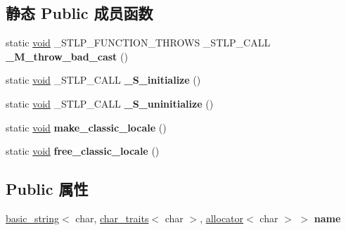 \subsection*{静态 Public 成员函数}
\begin{DoxyCompactItemize}
\item 
\mbox{\label{class___locale__impl_a120488ac7f5af2956e756d90b7b0405c}} 
static \hyperlink{interfacevoid}{void} \+\_\+\+S\+T\+L\+P\+\_\+\+F\+U\+N\+C\+T\+I\+O\+N\+\_\+\+T\+H\+R\+O\+WS \+\_\+\+S\+T\+L\+P\+\_\+\+C\+A\+LL {\bfseries \+\_\+\+M\+\_\+throw\+\_\+bad\+\_\+cast} ()
\item 
\mbox{\label{class___locale__impl_a953a01ba45da0494d104bad491c269bb}} 
static \hyperlink{interfacevoid}{void} \+\_\+\+S\+T\+L\+P\+\_\+\+C\+A\+LL {\bfseries \+\_\+\+S\+\_\+initialize} ()
\item 
\mbox{\label{class___locale__impl_a6539766c0877d31c048d2cbdd97c439e}} 
static \hyperlink{interfacevoid}{void} \+\_\+\+S\+T\+L\+P\+\_\+\+C\+A\+LL {\bfseries \+\_\+\+S\+\_\+uninitialize} ()
\item 
\mbox{\label{class___locale__impl_a051f12ab431a8a007f4a6208ef146be1}} 
static \hyperlink{interfacevoid}{void} {\bfseries make\+\_\+classic\+\_\+locale} ()
\item 
\mbox{\label{class___locale__impl_a77bd866043c4af70808d8a17c2ceab94}} 
static \hyperlink{interfacevoid}{void} {\bfseries free\+\_\+classic\+\_\+locale} ()
\end{DoxyCompactItemize}
\subsection*{Public 属性}
\begin{DoxyCompactItemize}
\item 
\mbox{\label{class___locale__impl_a4b6260d4903d0cdbbb77e92a879829d6}} 
\hyperlink{classbasic__string}{basic\+\_\+string}$<$ char, \hyperlink{classchar__traits}{char\+\_\+traits}$<$ char $>$, \hyperlink{classallocator}{allocator}$<$ char $>$ $>$ {\bfseries name}
\end{DoxyCompactItemize}
